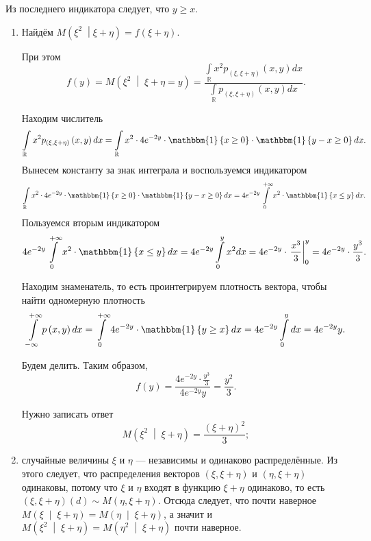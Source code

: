 Из последнего индикатора следует, что $y \geq x$.

\begin{enumerate}[label=\alph*)]
\item Найдём $M \left( \xi^2 \; \middle| \xi + \eta \right) = f \left( \xi + \eta \right) $.

  При этом
  $$f \left( y \right) =
    M \left( \xi^2 \; \middle| \; \xi + \eta = y \right) =
    \frac{ \int \limits_{ \mathbb{R}} x^2 p_{ \left( \xi, \xi + \eta \right) } \left( x, y \right) dx}{ \int \limits_{ \mathbb{R}} p_{ \left( \xi, \xi + \eta \right) } \left( x, y \right) dx}.$$

  Находим числитель
  $$ \int \limits_{ \mathbb{R}} x^2 p_{ \left( \xi, \xi + \eta \right) } \left( x, y \right) dx =
    \int \limits_{ \mathbb{R}}
      x^2 \cdot 4e^{-2y} \cdot \mathbbm{1} \left\{ x \geq 0 \right\} \cdot
      \mathbbm{1} \left\{ y - x \geq 0 \right\} dx.$$
  Вынесем константу за знак интеграла и воспользуемся индикатором
  $$ \int \limits_{ \mathbb{R}}
      x^2 \cdot 4e^{-2y} \cdot \mathbbm{1} \left\{ x \geq 0 \right\} \cdot
      \mathbbm{1} \left\{ y - x \geq 0 \right\} dx =
    4e^{-2y} \int \limits_0^{+ \infty } x^2 \cdot \mathbbm{1} \left\{ x \leq y \right\} dx.$$
  Пользуемся вторым индикатором
  $$4e^{-2y} \int \limits_0^{+ \infty } x^2 \cdot \mathbbm{1} \left\{ x \leq y \right\} dx =
    4e^{-2y} \int \limits_0^y x^2 dx =
    4e^{-2y} \cdot \left. \frac{x^3}{3} \right|_0^y =
    4e^{-2y} \cdot \frac{y^3}{3}.$$

  Находим знаменатель, то есть проинтегрируем плотность вектора, чтобы найти одномерную плотность
  $$ \int \limits_{- \infty }^{+ \infty } p \left( x, y \right) dx =
    \int \limits_0^{+ \infty } 4e^{-2y} \cdot \mathbbm{1} \left\{ y \geq x \right\} dx =
    4e^{-2y} \int \limits_0^y dx =
    4e^{-2y} y.$$

  Будем делить.
  Таким образом,
  $$f \left( y \right) =
    \frac{4e^{-2y} \cdot \frac{y^3}{3}}{4e^{-2y} y} =
    \frac{y^2}{3}.$$

  Нужно записать ответ
  $$M \left( \xi^2 \; \middle| \; \xi + \eta \right) =
    \frac{ \left( \xi + \eta \right)^2}{3};$$
  \item случайные величины $ \xi $ и $ \eta $ --- независимы и одинаково распределённые.
  Из этого следует,
  что распределения векторов $ \left( \xi, \xi + \eta \right) $ и
  $ \left( \eta, \xi + \eta \right) $ одинаковы,
  потому что $ \xi $ и $ \eta $ входят в функцию $ \xi + \eta $ одинаково,
  то есть
  $ \left( \xi, \xi + \eta \right) \left( d \right) \sim
    M \left( \eta, \xi + \eta \right) $.
  Отсюда следует,
  что почти наверное
  $M \left( \xi \; \middle| \; \xi + \eta \right) =
    M \left( \eta \; \middle| \; \xi + \eta \right) $,
  а значит и
  $M \left( \xi^2 \; \middle| \; \xi + \eta \right) =
    M \left( \eta^2 \; \middle| \; \xi + \eta \right) $
  почти наверное.


\end{enumerate}

